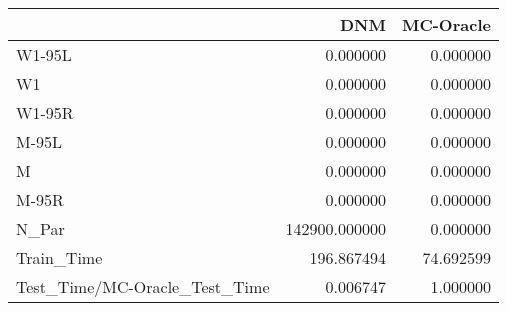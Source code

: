 \begin{tabular}{lrr}
\toprule
{} &            DNM &  MC-Oracle \\
\midrule
W1-95L                        &       0.000000 &   0.000000 \\
W1                            &       0.000000 &   0.000000 \\
W1-95R                        &       0.000000 &   0.000000 \\
M-95L                         &       0.000000 &   0.000000 \\
M                             &       0.000000 &   0.000000 \\
M-95R                         &       0.000000 &   0.000000 \\
N\_Par                         &  142900.000000 &   0.000000 \\
Train\_Time                    &     196.867494 &  74.692599 \\
Test\_Time/MC-Oracle\_Test\_Time &       0.006747 &   1.000000 \\
\bottomrule
\end{tabular}
